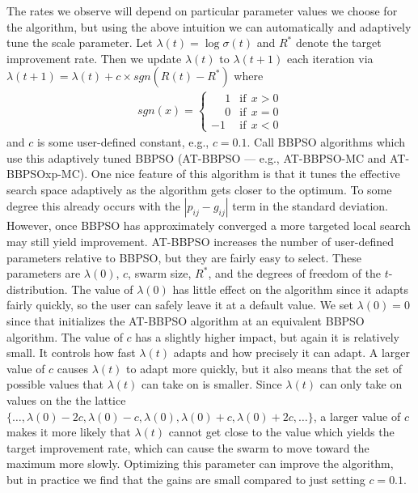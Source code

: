 \documentclass[12pt]{article}
\begin{document}
The rates we observe will depend on particular parameter values we choose for the algorithm, but using the above intuition we can automatically and adaptively tune the scale parameter. Let $\lambda(t) = \log \sigma(t)$ and $R^*$ denote the target improvement rate. Then we update $\lambda(t)$ to $\lambda(t+1)$ each iteration via $\lambda(t+1) = \lambda(t) + c\times sgn(R(t) - R^*)$ where 
\begin{align*}
sgn(x) = \begin{cases} \phantom{-}1 & \mathrm{ if  }\ \ x > 0\\
                       \phantom{-}0 & \mathrm{ if  }\ \ x = 0\\
                                - 1 & \mathrm{ if  }\ \ x < 0\end{cases}
\end{align*}
and $c$ is some user-defined constant, e.g., $c=0.1$. Call BBPSO algorithms which use this adaptively tuned BBPSO (AT-BBPSO --- e.g., AT-BBPSO-MC and AT-BBPSOxp-MC). One nice feature of this algorithm is that it tunes the effective search space adaptively as the algorithm gets closer to the optimum. To some degree this already occurs with the $|p_{ij} - g_{ij}|$ term in the standard deviation. However, once BBPSO has approximately converged a more targeted local search may still yield improvement. AT-BBPSO increases the number of user-defined parameters relative to BBPSO, but they are fairly easy to select. These parameters are $\lambda(0)$, $c$, swarm size, $R^*$, and the degrees of freedom of the $t$-distribution. The value of $\lambda(0)$ has little effect on the algorithm since it adapts fairly quickly, so the user can safely leave it at a default value. We set $\lambda(0)=0$ since that initializes the AT-BBPSO algorithm at an equivalent BBPSO algorithm. The value of $c$ has a slightly higher impact, but again it is relatively small. It controls how fast $\lambda(t)$ adapts and how precisely it can adapt. A larger value of $c$ causes $\lambda(t)$ to adapt more quickly, but it also means that the set of possible values that $\lambda(t)$ can take on is smaller. Since $\lambda(t)$ can only take on values on the the lattice $\{\dots, \lambda(0) - 2c, \lambda(0) - c, \lambda(0), \lambda(0) + c, \lambda(0) + 2c, \dots\}$, a larger value of $c$ makes it more likely that $\lambda(t)$ cannot get close to the value which yields the target improvement rate, which can cause the swarm to move toward the maximum more slowly. Optimizing this parameter can improve the algorithm, but in practice we find that the gains are small compared to just setting $c=0.1$.
\end{document}
